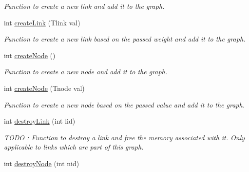\begin{DoxyCompactItemize}
\begin{DoxyCompactList}\small\item\em Function to create a new link and add it to the graph. \end{DoxyCompactList}\item 
int \hyperlink{classGraph_a23ee6873217991bbc46d70dde9239e1f}{create\+Link} (Tlink val)\hypertarget{classGraph_a23ee6873217991bbc46d70dde9239e1f}{}\label{classGraph_a23ee6873217991bbc46d70dde9239e1f}

\begin{DoxyCompactList}\small\item\em Function to create a new link based on the passed weight and add it to the graph. \end{DoxyCompactList}\item 
int \hyperlink{classGraph_a3a887e466c64e283afccde959493bd4a}{create\+Node} ()\hypertarget{classGraph_a3a887e466c64e283afccde959493bd4a}{}\label{classGraph_a3a887e466c64e283afccde959493bd4a}

\begin{DoxyCompactList}\small\item\em Function to create a new node and add it to the graph. \end{DoxyCompactList}\item 
int \hyperlink{classGraph_aecb7bf8c8745903053807b05e5d6fefb}{create\+Node} (Tnode val)\hypertarget{classGraph_aecb7bf8c8745903053807b05e5d6fefb}{}\label{classGraph_aecb7bf8c8745903053807b05e5d6fefb}

\begin{DoxyCompactList}\small\item\em Function to create a new node based on the passed value and add it to the graph. \end{DoxyCompactList}\item 
int \hyperlink{classGraph_ab55f18c45c3ffa8c8d61a5517b856e17}{destroy\+Link} (int lid)\hypertarget{classGraph_ab55f18c45c3ffa8c8d61a5517b856e17}{}\label{classGraph_ab55f18c45c3ffa8c8d61a5517b856e17}

\begin{DoxyCompactList}\small\item\em T\+O\+DO \+: Function to destroy a link and free the memory associated with it. Only applicable to links which are part of this graph. \end{DoxyCompactList}\item 
int \hyperlink{classGraph_a622e2c0ef87a8dd227d0ac04140e6680}{destroy\+Node} (int nid)\hypertarget{classGraph_a622e2c0ef87a8dd227d0ac04140e6680}{}\label{classGraph_a622e2c0ef87a8dd227d0ac04140e6680}


\end{DoxyCompactItemize}

